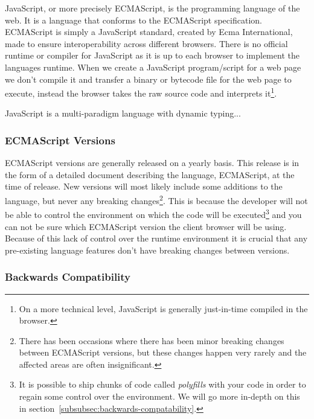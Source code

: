 JavaScript, or more precisely ECMAScript, is the programming language of the web.
It is a language that conforms to the ECMAScript specification.
ECMAScript is simply a JavaScript standard, created by Ecma International, made to ensure interoperability across different browsers.
There is no official runtime or compiler for JavaScript as it is up to each browser to implement the languages runtime.
When we create a JavaScript program/script for a web page we don't compile it and transfer a binary or bytecode file for the web page to execute, instead the browser takes the raw source code and interprets it\footnote{On a more technical level, JavaScript is generally just-in-time compiled in the browser.}.

JavaScript is a multi-paradigm language with dynamic typing...

\subsubsection{ECMAScript Versions}\label{subsubsec:ecmascript-versions}

ECMAScript versions are generally released on a yearly basis.
This release is in the form of a detailed document describing the language, ECMAScript, at the time of release.
New versions will most likely include some additions to the language, but never any breaking changes\footnote{There has been occasions where there has been minor breaking changes between ECMAScript versions, but these changes happen very rarely and the affected areas are often insignificant.}.
This is because the developer will not be able to control the environment on which the code will be executed\footnote{It is possible to ship chunks of code called \textit{polyfills} with your code in order to regain some control over the environment. We will go more in-depth on this in section~\vref{subsubsec:backwards-compatability}.} and you can not be sure which ECMAScript version the client browser will be using.
Because of this lack of control over the runtime environment it is crucial that any pre-existing language features don't have breaking changes between versions.

\subsubsection{Backwards Compatibility}\label{subsubsec:backwards-compatability}

